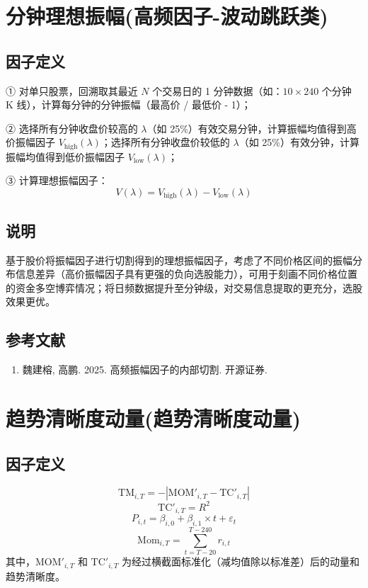 \documentclass{article}
\begin{document}
\section{分钟理想振幅(高频因子-波动跳跃类)}

\subsection{因子定义}

① 对单只股票，回溯取其最近 \( N \) 个交易日的 1 分钟数据（如：\(10 \times 240\) 个分钟 K 线），计算每分钟的分钟振幅（最高价 / 最低价 - 1）；

② 选择所有分钟收盘价较高的 \( \lambda \)（如 25\%）有效交易分钟，计算振幅均值得到高价振幅因子 \( V_{\text{high}}(\lambda) \)；选择所有分钟收盘价较低的 \( \lambda \)（如 25\%）有效分钟，计算振幅均值得到低价振幅因子 \( V_{\text{low}}(\lambda) \)；

③ 计算理想振幅因子：
\begin{equation}
    V(\lambda) = V_{\text{high}}(\lambda) - V_{\text{low}}(\lambda)
\end{equation}

\subsection{说明}
基于股价将振幅因子进行切割得到的理想振幅因子，考虑了不同价格区间的振幅分布信息差异（高价振幅因子具有更强的负向选股能力），可用于刻画不同价格位置的资金多空博弈情况；将日频数据提升至分钟级，对交易信息提取的更充分，选股效果更优。

\subsection{参考文献}
\begin{enumerate}
    \item 魏建榕, 高鹏. 2025. 高频振幅因子的内部切割. 开源证券.
\end{enumerate}

\section{趋势清晰度动量(趋势清晰度动量)}

\subsection{因子定义}
\begin{equation}
    \mathrm{TM}_{i,T} = -|\mathrm{MOM}'_{i,T} - \mathrm{TC}'_{i,T}|
\end{equation}
\begin{equation}
    \mathrm{TC}'_{i,T} = R^2
\end{equation}
\begin{equation}
    P_{i,t} = \beta_{i,0} + \beta_{i,1} \times t + \varepsilon_t
\end{equation}
\begin{equation}
    \mathrm{Mom}_{i,T} = \sum_{t=T-20}^{T-240} r_{i,t}
\end{equation}
其中，\(\mathrm{MOM}'_{i,T}\) 和 \(\mathrm{TC}'_{i,T}\) 为经过横截面标准化（减均值除以标准差）后的动量和趋势清晰度。
\end{document}
